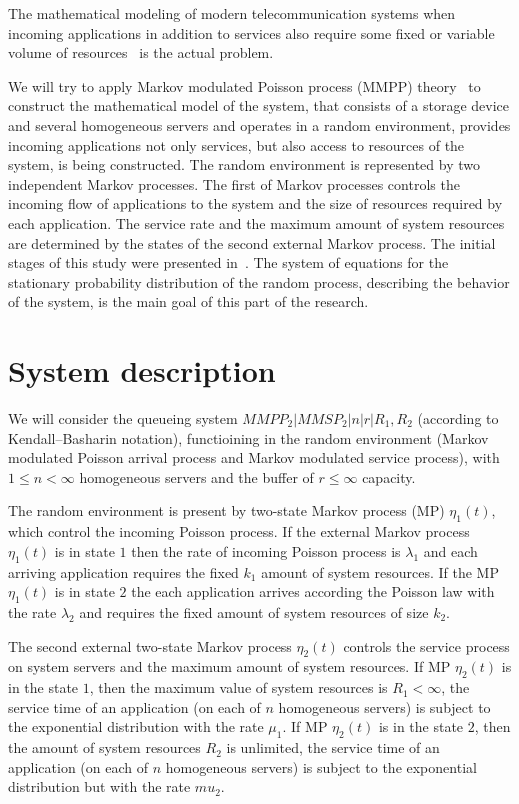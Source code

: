 {The mathematical modeling of modern telecommunication systems when
incoming applications in addition to services also require some fixed
or variable volume of
resources~\cite{sop1,sop3,sop4,sop5,sop6,sop7,sop8} is the actual
problem.

We will try to apply Markov modulated Poisson process (MMPP)
theory~\cite{Neuts3,Neuts4,Neuts5,Neuts6,4} to construct the
mathematical model of the system, that consists of a storage device
and several homogeneous servers and operates in a random environment,
provides incoming applications not only services, but also access to
resources of the system, is being constructed. The random environment
is represented by two independent Markov processes. The first of
Markov processes controls the incoming flow of applications to the
system and the size of resources required by each application. The
service rate and the maximum amount of system resources are determined
by the states of the second external Markov process.  The initial
stages of this study were presented in~\cite{13}. The system of
equations for the stationary probability distribution of the random
process, describing the behavior of the system, is the main goal of
this part of the research.



\section{System description}
\label{sec:base-section}

We will consider the queueing system $MMPP_2 |MMSP_2 |n|r|R_1,R_2$
(according to Kendall--Basharin notation\cite{Boch}), functioining in
the random environment (Markov modulated Poisson arrival process and
Markov modulated service process), with $1\leqslant  n<\infty$ homogeneous
servers and the buffer of $r\leqslant  \infty$ capacity.


The random environment is present by two-state Markov process (MP)
$\eta_1 (t)$, which control the incoming Poisson process.  If the
external Markov process $\eta_1 (t)$ is in state $1$ then the rate of
incoming Poisson process is $\lambda_1$ and each arriving application
requires the fixed $k_1$ amount of system resources. If the MP
$\eta_1 (t)$ is in state $2$ the each application arrives according
the Poisson law with the rate $\lambda_2$ and requires the fixed
amount of system resources of size $k_2$.

The second external two-state Markov process $\eta_2 (t)$ controls the
service process on system servers and the maximum amount of system
resources. If MP $\eta_2 (t)$ is in the state $1$, then the maximum
value of system resources is $R_1<\infty$, the service time of an
application (on each of $n$ homogeneous servers) is subject to the
exponential distribution with the rate $\mu_1$. If MP $\eta_2 (t)$ is
in the state $2$, then the amount of system resources $R_2$ is
unlimited, the service time of an application (on each of $n$
homogeneous servers) is subject to the exponential distribution but
with the rate $mu_2$.

}
